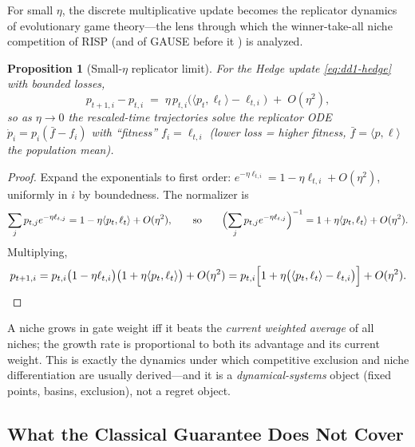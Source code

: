 \documentclass[11pt,a4paper]{article}
\theoremstyle{definition}
\theoremstyle{plain}
\newtheorem{proposition}{Proposition}[section]
\newcommand{\nm}{\textsc{RISP}}
\begin{document}
For small $\eta$, the discrete multiplicative update becomes the replicator
dynamics of evolutionary game theory---the lens through which the
winner-take-all niche competition of \nm{} (and of GAUSE before it
\cite{li2026gause}) is analyzed.

\begin{proposition}[Small-$\eta$ replicator limit]
\label{prop:dd1-replicator}
For the Hedge update \eqref{eq:dd1-hedge} with bounded losses,
\begin{equation}
\label{eq:dd1-replicator}
p_{t+1, i} - p_{t, i}
\;=\; \eta\, p_{t,i} \bigl( \langle p_t, \ell_t \rangle - \ell_{t,i} \bigr)
\;+\; O(\eta^2),
\end{equation}
so as $\eta \to 0$ the rescaled-time trajectories solve the replicator ODE
$\dot{p}_i = p_i (\bar{f} - f_i)$ with ``fitness'' $f_i = \ell_{t,i}$ (lower
loss = higher fitness, $\bar{f} = \langle p, \ell\rangle$ the population
mean).
\end{proposition}

\begin{proof}
Expand the exponentials to first order: $e^{-\eta \ell_{t,i}} = 1 - \eta
\ell_{t,i} + O(\eta^2)$, uniformly in $i$ by boundedness. The normalizer is
\[
\sum_j p_{t,j} e^{-\eta \ell_{t,j}}
= 1 - \eta \langle p_t, \ell_t \rangle + O(\eta^2),
\qquad\text{so}\qquad
\Bigl( \sum_j p_{t,j} e^{-\eta \ell_{t,j}} \Bigr)^{-1}
= 1 + \eta \langle p_t, \ell_t \rangle + O(\eta^2).
\]
Multiplying,
\[
p_{t+1,i} = p_{t,i} \bigl(1 - \eta \ell_{t,i}\bigr)
\bigl(1 + \eta \langle p_t, \ell_t\rangle\bigr) + O(\eta^2)
= p_{t,i}\Bigl[ 1 + \eta\bigl( \langle p_t, \ell_t \rangle - \ell_{t,i}
\bigr) \Bigr] + O(\eta^2). \qedhere
\]
\end{proof}

\begin{intuition}
A niche grows in gate weight iff it beats the \emph{current
weighted average} of all niches; the growth rate is proportional to both its
advantage and its current weight. This is exactly the dynamics under which
competitive exclusion and niche differentiation are usually derived---and it
is a \emph{dynamical-systems} object (fixed points, basins, exclusion), not a
regret object.
\end{intuition}

\subsection{What the Classical Guarantee Does Not Cover}
\label{sec:dd1-online-limits}
\end{document}
